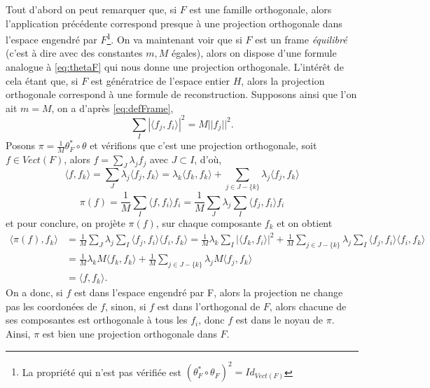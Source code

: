 Tout d'abord on peut remarquer que, si $F$ est une famille orthogonale, alors l'application précédente correspond presque à une projection orthogonale dans l'espace engendré par $F$\footnote{La propriété qui n'est pas vérifiée est $(\theta^*_F \circ \theta_F)^2 = Id_{Vect(F)}$}.
On va maintenant voir que si $F$ est un frame \textit{équilibré} (c'est à dire avec des constantes $m, M$ égales), alors on dispose d'une formule analogue à \ref{eq:thetaF} qui nous donne une projection orthogonale.
L'intérêt de cela étant que, si $F$ est génératrice de l'espace entier $H$, alors la projection orthogonale correspond à une formule de reconstruction.
\newline
Supposons ainsi que l'on ait $m =M$, on a d'après \ref{eq:defFrame}, 
\begin{equation*}
	\sum_I |\langle f_j, f_i \rangle |^2 = M||f_j||^2.
\end{equation*}
Posons $\pi = \frac{1}{M}\theta^*_F \circ \theta$ et vérifions que c'est une projection orthogonale, soit $f\in Vect(F)$, alors
$f = \sum_J \lambda_j f_j$ avec $J\subset I$, d'où,
\begin{equation*}
	\langle f, f_k \rangle = \sum_J \lambda_j \langle f_j, f_k \rangle = \lambda_k \langle f_k, f_k \rangle + \sum_{j \in J-\{k\}} \lambda_j \langle f_j, f_k \rangle  
\end{equation*}
\begin{equation*}
	\pi(f) = \frac{1}{M}\sum_I \langle f, f_i \rangle f_i 
	= \frac{1}{M}\sum_J \lambda_j \sum_I \langle f_j, f_i \rangle f_i  
\end{equation*}
et pour conclure, on projète $\pi(f)$, sur chaque composante $f_k$ et on obtient
\begin{align*}
	\langle \pi(f), f_k \rangle &= \frac{1}{M} \sum_J \lambda_j \sum_I \langle f_j, f_i \rangle \langle f_i, f_k \rangle 
	= \frac{1}{M}  \lambda_k \sum_I |\langle f_k, f_i\rangle|^2 + \frac{1}{M} \sum_{j \in J-\{k\}}\lambda_j \sum_I  \langle f_j, f_i \rangle \langle f_i, f_k \rangle \\
	&= \frac{1}{M} \lambda_k M \langle f_k, f_k \rangle + \frac{1}{M} \sum_{j \in J-\{k\}} \lambda_j M\langle f_j, f_k \rangle \\
	&= \langle f, f_k \rangle.
\end{align*}
On a donc, si $f$ est dans l'espace engendré par F, alors la projection ne change pas les coordonées de $f$, sinon, si $f$ est dans l'orthogonal de $F$, alors chacune de ses composantes est orthogonale à tous les $f_i$, donc $f$ est dans le noyau de $\pi$.
Ainsi, $\pi$ est bien une projection orthogonale dans $F$.
